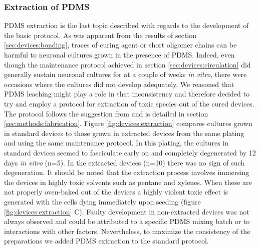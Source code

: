         \subsubsection{Extraction of PDMS}
        PDMS extraction is the last topic described with regards to the development of the basic protocol. As was apparent from the results of section \ref{sec:devices:bonding}, traces of curing agent or short oligomer chains can be harmful to neuronal cultures grown in the presence of PDMS. Indeed, even though the maintenance protocol achieved in section \ref{sec:devices:circulation} did generally sustain neuronal cultures for at a couple of weeks \textit{in vitro}, there were occasions where the cultures did not develop adequately. We reasoned that PDMS leaching might play a role in that inconsistency and therefore decided to try and employ a protocol for extraction of toxic species out of the cured devices. The protocol follows the suggestion from \cite{millet2007microfluidic} and is detailed in section \ref{sec:methods:fabrication}. Figure \ref{fig:devices:extraction} compares cultures grown in standard devices to those grown in extracted devices from the same plating and using the same maintenance protocol. In this plating, the cultures in standard devices seemed to fasciculate early on and completely degenerated by 12 days \textit{in vitro} (n=5). In the extracted devices (n=10) there was no sign of such degeneration. It should be noted that the extraction process involves immersing the devices in highly toxic solvents such as pentane and xylenes. When these are not properly oven-baked out of the devices a highly violent toxic effect is generated with the cells dying immediately upon seeding (figure \ref{fig:devices:extraction} C). Faulty development in non-extracted devices was not always observed and could be attributed to a specific PDMS mixing batch or to interactions with other factors. Nevertheless, to maximize the consistency of the preparations we added PDMS extraction to the standard protocol.

